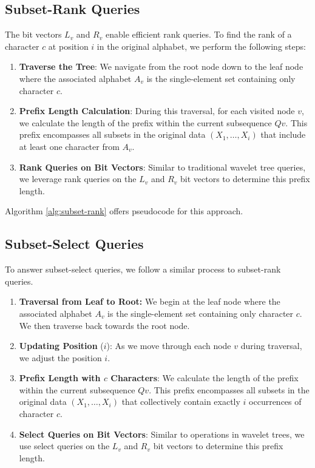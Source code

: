 \subsection{Subset-Rank Queries} \label{sec:subset_rank_queries}

\noindent The bit vectors $L_v$ and $R_v$ enable efficient rank queries. To find the rank of a character $c$ at position $i$ in the original alphabet, we perform the following steps:
\begin{enumerate}
    \item \textbf{Traverse the Tree}: We navigate from the root node down to the leaf node where the associated alphabet $A_v$ is the single-element set containing only character $c$.
    \item \textbf{Prefix Length Calculation}: During this traversal, for each visited node $v$, we calculate the length of the prefix within the current subsequence $Qv$. This prefix encompasses all subsets in the original data $(X_1,\dots, X_i)$ that include at least one character from $A_v$.
    \item \textbf{Rank Queries on Bit Vectors}: Similar to traditional wavelet tree queries, we leverage rank queries on the $L_v$ and $R_v$ bit vectors to determine this prefix length.
\end{enumerate}
Algorithm \ref{alg:subset-rank} offers pseudocode for this approach.


\subsection{Subset-Select Queries} \label{sec:subset_select_queries}

To answer subset-select queries, we follow a similar process to subset-rank queries.

\begin{enumerate}
    \item \textbf{Traversal from Leaf to Root:} We begin at the leaf node where the associated alphabet $A_v$ is the single-element set containing only character $c$. We then traverse back towards the root node.
    \item \textbf{Updating Position} ($i$): As we move through each node $v$ during traversal, we adjust the position $i$.
    \item \textbf{Prefix Length with $c$ Characters}: We calculate the length of the prefix within the current subsequence $Qv$. This prefix encompasses all subsets in the original data $(X_1,\dots, X_i)$ that collectively contain exactly $i$ occurrences of character $c$.
    \item \textbf{Select Queries on Bit Vectors}: Similar to operations in wavelet trees, we use select queries on the $L_v$ and $R_v$ bit vectors to determine this prefix length.
\end{enumerate}

